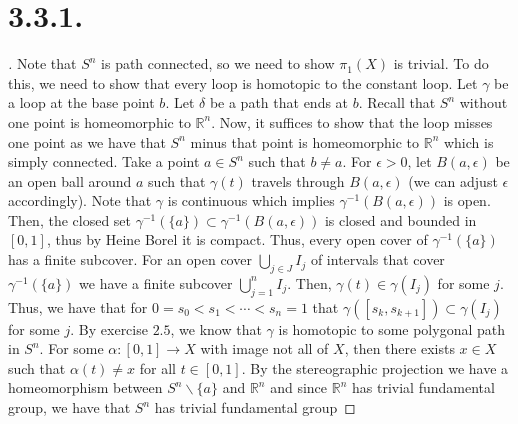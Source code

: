 \documentclass{article}
\begin{document}
\section*{3.3.1.}
\begin{proof}[\unskip\nopunct]
   Note that $S^n$ is path connected, so we need to show $\pi_1(X)$ is trivial. To do this, we need to show that every loop is homotopic to the constant loop. 
   Let $\gamma$ be a loop at the base point $b$. Let $\delta$ be a path that ends at $b$. Recall that $S^n$ without one point is homeomorphic to $\mathbb{R}^n$. 
   Now, it suffices to show that the loop misses one point as we have that $S^n$ minus that point is homeomorphic to $\mathbb{R}^n$ which is simply connected. 
   Take a point $a \in S^n $ such that $b \neq a$. For $\epsilon > 0$, let $B(a , \epsilon)$ be an open ball around $a$ such that $\gamma(t)$ travels through $B(a, \epsilon)$ (we can adjust $\epsilon$ accordingly). 
   Note that $\gamma$ is continuous which implies $\gamma^{-1}(B(a, \epsilon))$ is open. Then, the closed set $\gamma^{-1}(\{a\}) \subset \gamma^{-1}(B(a, \epsilon))$ is closed 
   and bounded in $[0, 1]$, thus by Heine Borel it is compact. Thus, every open cover of $\gamma^{-1}(\{a\})$ has a finite subcover. 
   For an open cover $\bigcup\limits_{j \in J} I_j$ of intervals that cover $\gamma^{-1}(\{a\})$
   we have a finite subcover $\bigcup\limits_{j = 1}^n I_j$. 
   Then, $\gamma(t) \in \gamma(I_j)$ for some $j$. Thus, we have that for $0 = s_0 < s_1 < \cdots < s_n =  1$ that $\gamma([s_k, s_{k + 1}]) \subset \gamma(I_j)$ for some $j$. 
   By exercise $2.5$, we know that $\gamma$ is homotopic to some polygonal path in $S^n$. 
   For some $\alpha:[0, 1] \to X$ with image not all of $X$, then there exists $x \in X$ such that $\alpha(t) \neq x$ for all $t \in [0, 1]$. 
   By the stereographic projection we have a homeomorphism between $S^n \backslash \{a\}$ and $\mathbb{R}^n$ and since $\mathbb{R}^n$ has trivial fundamental group, we have that $S^n$ has trivial fundamental group

   
   
\end{proof}
\end{document}
